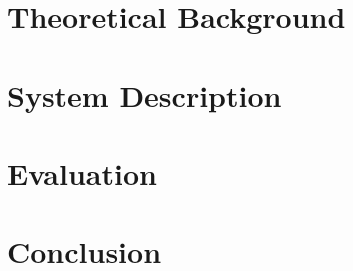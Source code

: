 \documentclass[diploma, english]{softlab-thesis}
\begin{document}
\chapter{Theoretical Background}


\chapter{System Description}


\chapter{Evaluation}


\chapter{Conclusion}






\end{document}
